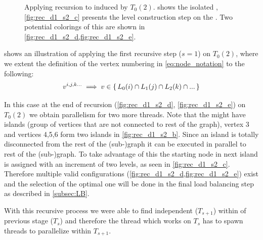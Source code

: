 \begin{figure}[thbp]
	     \hspace{1.75em}
     	\caption{Applying recursion to \subgraph induced by $T_0(2)$.  shows the isolated \subgraph, \cref{fig:rec_d1_s2_c} presents the level construction step on the \subgraph. Two potential \DONE colorings of this  \subgraph are shown in \cref{fig:rec_d1_s2_d,fig:rec_d1_s2_e}.}
     	
     	\label{fig:rec_d1_s2}
     \end{figure}
     
      shows an illustration of applying the first recursive step ($s=1$) on $T_0(2)$, where we extent the definition of the vertex numbering in \cref{eq:node_notation} to the following:
	 \begin{equation}
	    v^{i,j,k...} \implies v \in \set{L_0(i) \cap L_1(j) \cap L_2(k) \cap ...} 
	 \end{equation}
	 
     In this case at the end of recursion (\cf \cref{fig:rec_d1_s2_d}, \cref{fig:rec_d1_s2_e}) on $T_0(2)$ we obtain parallelism for two more threads. Note that the \subgraphs might have islands (group of vertices that are not connected to rest of the graph), \eg vertex 3 and vertices 4,5,6 form two islands in \cref{fig:rec_d1_s2_b}. Since an island is totally disconnected from the rest of the (sub-)graph it can be executed in parallel to rest of the (sub-)graph. To take advantage of this the starting node in next island is assigned with an increment of two levels, as seen in \cref{fig:rec_d1_s2_c}. Therefore multiple valid \DONE configurations (\cf \cref{fig:rec_d1_s2_d,fig:rec_d1_s2_e}) exist and the selection of the optimal one will be done in the final load balancing step as described in \cref{subsec:LB}.    
     
     With this recursive process we were able to find independent \levelGroups ($T_{s+1}$) within \levelGroup of previous stage ($T_s$) and therefore the thread which works on $T_s$ has to spawn threads to parallelize within $T_{s+1}$.
     

